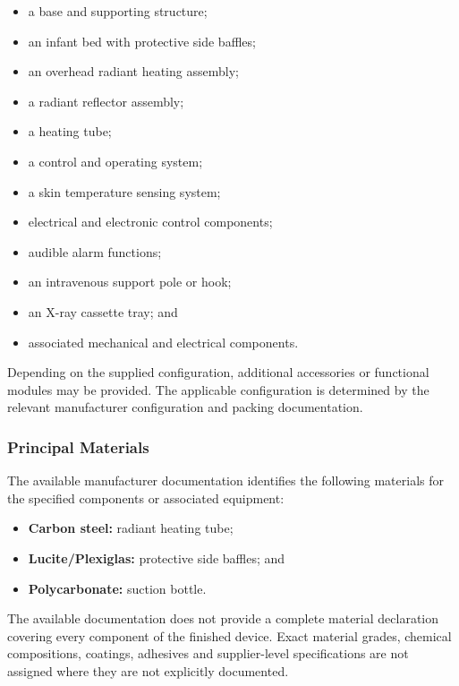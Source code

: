 \begin{itemize}
    \item a base and supporting structure;
    \item an infant bed with protective side baffles;
    \item an overhead radiant heating assembly;
    \item a radiant reflector assembly;
    \item a heating tube;
    \item a control and operating system;
    \item a skin temperature sensing system;
    \item electrical and electronic control components;
    \item audible alarm functions;
    \item an intravenous support pole or hook;
    \item an X-ray cassette tray; and
    \item associated mechanical and electrical components.
\end{itemize}

Depending on the supplied configuration, additional accessories or
functional modules may be provided. The applicable configuration
is determined by the relevant manufacturer configuration and
packing documentation.


\subsubsection{Principal Materials}

The available manufacturer documentation identifies the following
materials for the specified components or associated equipment:

\begin{itemize}
    \item \textbf{Carbon steel:} radiant heating tube;
    \item \textbf{Lucite/Plexiglas:} protective side baffles; and
    \item \textbf{Polycarbonate:} suction bottle.
\end{itemize}

The available documentation does not provide a complete material
declaration covering every component of the finished device.
Exact material grades, chemical compositions, coatings, adhesives
and supplier-level specifications are not assigned where they are
not explicitly documented.

